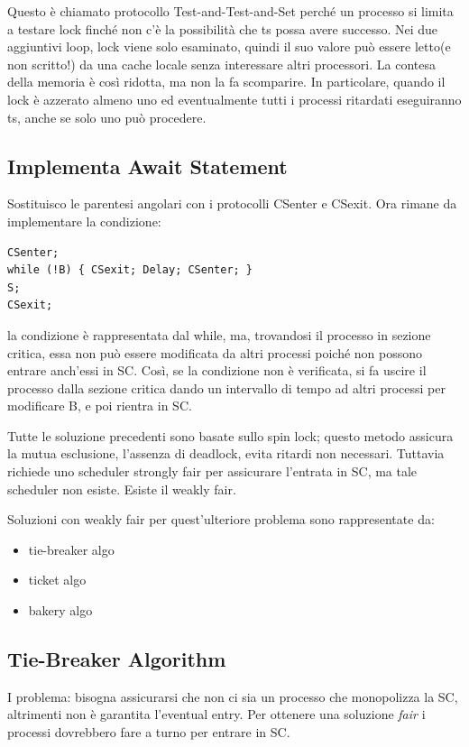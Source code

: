 \documentclass[10pt,a4paper]{book}
\begin{document}
Questo è chiamato protocollo Test-and-Test-and-Set perché un processo si limita a testare lock finché non c'è la possibilità che ts possa avere successo. Nei due aggiuntivi loop, lock viene solo esaminato, quindi il suo valore può essere letto(e non scritto!) da una cache locale senza interessare altri processori. La contesa della memoria è così ridotta, ma non la fa scomparire. In particolare, quando il lock è azzerato almeno uno ed eventualmente tutti i processi ritardati eseguiranno ts, anche se solo uno può procedere.

\subsection{Implementa Await Statement}
Sostituisco le parentesi angolari con i protocolli CSenter e CSexit.
Ora rimane da implementare la condizione: 
\begin{verbatim}
CSenter;
while (!B) { CSexit; Delay; CSenter; }
S;
CSexit;
\end{verbatim}
la condizione è rappresentata dal while, ma, trovandosi il processo in sezione critica, essa non può essere modificata da altri processi poiché non possono entrare anch'essi in SC. Così, se la condizione non è verificata, si fa uscire il processo dalla sezione critica dando un intervallo di tempo ad altri processi per modificare B, e poi rientra in SC.

Tutte le soluzione precedenti sono basate sullo spin lock; questo metodo assicura la mutua esclusione, l'assenza di deadlock, evita ritardi non necessari. Tuttavia richiede uno scheduler strongly fair per assicurare l'entrata in SC, ma tale scheduler non esiste. Esiste il weakly fair.

Soluzioni con weakly fair per quest'ulteriore problema sono rappresentate da:
\begin{itemize}
\item tie-breaker algo
\item ticket algo
\item bakery algo
\end{itemize}

\subsection{Tie-Breaker Algorithm}
I problema: bisogna assicurarsi che non ci sia un processo che monopolizza la SC, altrimenti non è garantita l'eventual entry. Per ottenere una soluzione \textit{fair} i processi dovrebbero fare a turno per entrare in SC.
\end{document}
